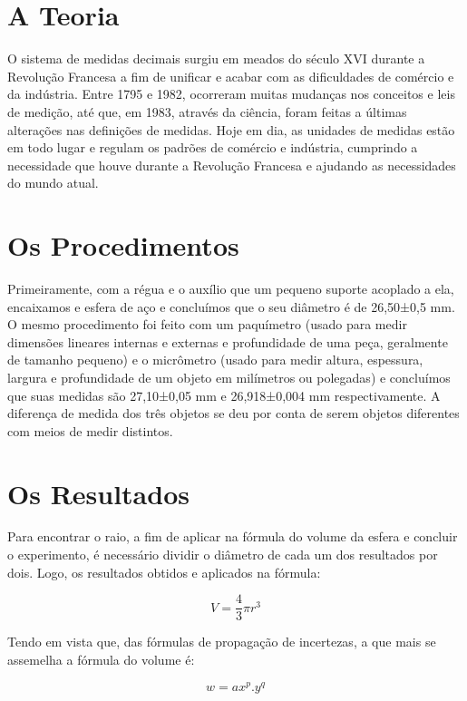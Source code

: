\documentclass[a4paper, 12pt]{article}
\begin{document}
\section{A Teoria}
O sistema de medidas decimais surgiu em meados do século XVI durante a Revolução Francesa a fim de unificar e acabar com as dificuldades de comércio e da indústria. Entre 1795 e 1982, ocorreram muitas mudanças nos conceitos e leis de medição, até que, em 1983, através da ciência, foram feitas a últimas alterações nas definições de medidas. Hoje em dia, as unidades de medidas estão em todo lugar e regulam os padrões de comércio e indústria, cumprindo a necessidade que houve durante a Revolução Francesa e ajudando as necessidades do mundo atual.

\section{Os Procedimentos}
Primeiramente, com a régua e o auxílio que um pequeno suporte acoplado a ela, encaixamos e esfera de aço e concluímos que o seu diâmetro é de 26,50±0,5 mm. O mesmo procedimento foi feito com um paquímetro (usado para medir dimensões lineares internas e externas e profundidade de uma peça, geralmente de tamanho pequeno) e o micrômetro (usado para medir altura, espessura, largura e profundidade de um objeto em milímetros ou polegadas) e concluímos que suas medidas são 27,10±0,05 mm e 26,918±0,004 mm respectivamente. A diferença de medida dos três objetos se deu por conta de serem objetos diferentes com meios de medir distintos. 

\section{Os Resultados}
Para encontrar o raio, a fim de aplicar na fórmula do volume da esfera e concluir o experimento, é necessário dividir o diâmetro de cada um dos resultados por dois. Logo, os resultados obtidos e aplicados na fórmula:

\begin{equation}
    V = \frac{4}{3}\pi r^{3}
\end{equation}

Tendo em vista que, das fórmulas de propagação de incertezas, a que mais se assemelha a fórmula do volume é:

\begin{equation}
    w = ax ^{p}. y^{q}
    
\end{equation}
\end{document}

